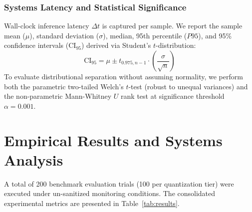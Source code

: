 \documentclass[conference]{IEEEtran}
\begin{document}
{\subsubsection{Systems Latency and Statistical Significance}
Wall-clock inference latency $\Delta t$ is captured per sample. We report the sample mean ($\mu$), standard deviation ($\sigma$), median, 95th percentile ($P95$), and 95\% confidence intervals ($\text{CI}_{95}$) derived via Student's $t$-distribution:
\begin{equation}
\text{CI}_{95} = \mu \pm t_{0.975, n-1} \cdot \left(\frac{\sigma}{\sqrt{n}}\right)
\end{equation}
To evaluate distributional separation without assuming normality, we perform both the parametric two-tailed Welch's $t$-test (robust to unequal variances) and the non-parametric Mann-Whitney $U$ rank test at significance threshold $\alpha = 0.001$.

\section{Empirical Results and Systems Analysis}
\label{sec:results}

A total of 200 benchmark evaluation trials (100 per quantization tier) were executed under un-sanitized monitoring conditions. The consolidated experimental metrics are presented in Table~\ref{tab:results}.

}
\end{document}
